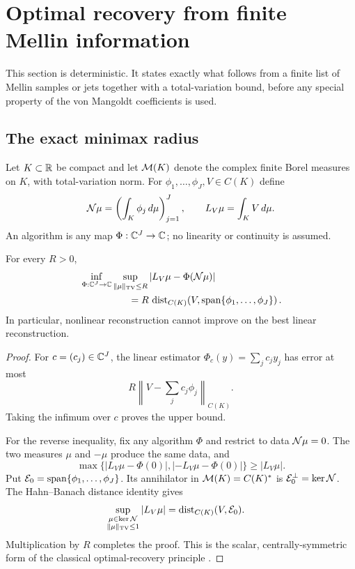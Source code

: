 \section{Optimal recovery from finite Mellin information}
\label{sec:minimax-recovery}

This section is deterministic.  It states exactly what follows from a
finite list of Mellin samples or jets together with a total-variation
bound, before any special property of the von Mangoldt coefficients is
used.

\subsection{The exact minimax radius}

Let $K\subset\mathbb R$ be compact and let $\mathcal M(K)$ denote the complex finite
Borel measures on $K$, with total-variation norm.  For
$\phi_1,\ldots,\phi_J,V\in C(K)$ define
\begin{equation}\label{eq:information-map}
 \mathcal N\mu=\left(\int_K\phi_j\,d\mu\right)_{j=1}^J,
 \qquad
 L_V\mu=\int_K V\,d\mu.
\end{equation}
An algorithm is any map $\Phi:\mathbb C^J\to\mathbb C$; no linearity or continuity is
assumed.

\begin{theorem}
\label{thm:exact-minimax}
For every $R>0$,
\begin{align}
 &\inf_{\Phi:\mathbb C^J\to\mathbb C}
 \sup_{\|\mu\|_{\mathrm{TV}}\leq R}
 \left|L_V\mu-\Phi(\mathcal N\mu)\right|
 \notag\\
 &\hspace{5em}=
 R\,\operatorname{dist}_{C(K)}\!\left(V,
 \operatorname{span}\{\phi_1,\ldots,\phi_J\}\right).
 \label{eq:exact-minimax}
\end{align}
In particular, nonlinear reconstruction cannot improve on the best linear
reconstruction.
\end{theorem}

\begin{proof}
For $c=(c_j)\in\mathbb C^J$, the linear estimator
$\Phi_c(y)=\sum_jc_jy_j$ has error at most
\[
 R\left\|V-\sum_jc_j\phi_j\right\|_{C(K)}.
\]
Taking the infimum over $c$ proves the upper bound.

For the reverse inequality, fix any algorithm $\Phi$ and restrict to data
$\mathcal N\mu=0$.  The two measures $\mu$ and $-\mu$ produce the same data, and
\[
 \max\{|L_V\mu-\Phi(0)|,|-L_V\mu-\Phi(0)|\}\geq|L_V\mu|.
\]
Put $\mathcal E_0=\operatorname{span}\{\phi_1,\ldots,\phi_J\}$.  Its annihilator
in $\mathcal M(K)=C(K)^*$ is
$\mathcal E_0^\perp=\ker\mathcal N$.  The Hahn--Banach distance identity gives
\begin{align*}
 \sup_{\substack{\mu\in\ker\mathcal N\\\|\mu\|_{\mathrm{TV}}\leq1}}|L_V\mu|
 &=\operatorname{dist}_{C(K)}(V,\mathcal E_0).
\end{align*}
Multiplication by $R$ completes the proof.  This is the scalar,
centrally-symmetric form of the classical optimal-recovery principle
\citep{MicchelliRivlin1977}.
\end{proof}

